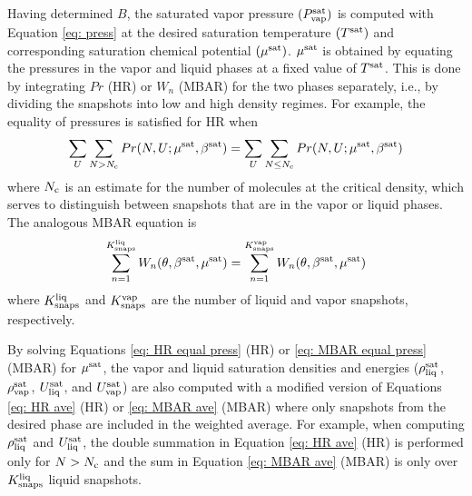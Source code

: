 \documentclass[journal=jced,manuscript=article]{achemso}
\begin{document}
Having determined $B$, the saturated vapor pressure $(P_{\rm vap}^{\rm sat})$ is computed with Equation \ref{eq: press} at the desired saturation temperature $(T^{\rm sat})$ and corresponding saturation chemical potential $(\mu^{\rm sat})$. $\mu^{\rm sat}$ is obtained by equating the pressures in the vapor and liquid phases at a fixed value of $T^{\rm sat}$. This is done by integrating $Pr$ (HR) or $W_{n}$ (MBAR) for the two phases separately, i.e., by dividing the snapshots into low and high density regimes. For example, the equality of pressures is satisfied for HR when
\begin{eqnarray} \label{eq: HR equal press}
\sum_{U} \sum_{N > N_{\rm c}} Pr(N,U;\mu^{\rm sat},\beta^{\rm sat}) = \sum_{U} \sum_{N \leq N_{\rm c}} Pr(N,U;\mu^{\rm sat},\beta^{\rm sat})
\end{eqnarray}
where $N_{\rm c}$ is an estimate for the number of molecules at the critical density, which serves to distinguish between snapshots that are in the vapor or liquid phases. The analogous MBAR equation is
\begin{eqnarray} \label{eq: MBAR equal press}
\sum_{n=1}^{K^{\rm liq}_{\rm snaps}} W_{n}(\theta,\beta^{\rm sat},\mu^{\rm sat}) = \sum_{n=1}^{K^{\rm vap}_{\rm snaps}} W_{n}(\theta,\beta^{\rm sat},\mu^{\rm sat})
\end{eqnarray}
where $K^{\rm liq}_{\rm snaps}$ and $K^{\rm vap}_{\rm snaps}$ are the number of liquid and vapor snapshots, respectively.

By solving Equations \ref{eq: HR equal press} (HR) or \ref{eq: MBAR equal press} (MBAR) for $\mu^{\rm sat}$, the vapor and liquid saturation densities and energies ($\rho_{\rm liq}^{\rm sat}$, $\rho_{\rm vap}^{\rm sat}$, $U_{\rm liq}^{\rm sat}$, and $U_{\rm vap}^{\rm sat}$) are also computed with a modified version of Equations \ref{eq: HR ave} (HR) or \ref{eq: MBAR ave} (MBAR) where only snapshots from the desired phase are included in the weighted average. For example, when computing $\rho_{\rm liq}^{\rm sat}$ and $U_{\rm liq}^{\rm sat}$, the double summation in Equation \ref{eq: HR ave} (HR) is performed only for $N > N_{\rm c}$ and the sum in Equation \ref{eq: MBAR ave} (MBAR) is only over $K^{\rm liq}_{\rm snaps}$ liquid snapshots.
\end{document}
